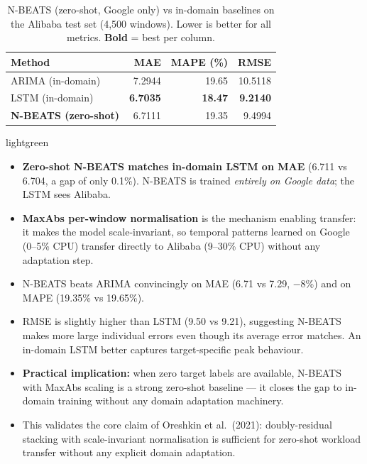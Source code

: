 \documentclass[12pt,a4paper]{article}
\begin{document}
\begin{table}[H]
\centering
\small
\caption{N-BEATS (zero-shot, Google only) vs in-domain baselines on the Alibaba test set
         (4,500 windows).  Lower is better for all metrics.  \textbf{Bold} = best per column.}
\label{tab:nbeats}
\begin{tabular}{@{}lrrr@{}}
\toprule
\textbf{Method} & \textbf{MAE} & \textbf{MAPE (\%)} & \textbf{RMSE} \\
\midrule
ARIMA (in-domain)   & 7.2944 & 19.65 & 10.5118 \\
LSTM (in-domain)    & \textbf{6.7035} & \textbf{18.47} & \phantom{0}\textbf{9.2140} \\
\midrule
\textcolor{nbeatscolor}{\textbf{N-BEATS (zero-shot)}} &
  6.7111 & 19.35 & \phantom{0}9.4994 \\
\bottomrule
\end{tabular}
\end{table}

\begin{keybox}{lightgreen}
\begin{itemize}[leftmargin=*,noitemsep]
  \item \textbf{Zero-shot N-BEATS matches in-domain LSTM on MAE} (6.711 vs 6.704, a gap of
        only 0.1\%).  N-BEATS is trained \emph{entirely on Google data}; the LSTM sees Alibaba.
  \item \textbf{MaxAbs per-window normalisation} is the mechanism enabling transfer: it makes
        the model scale-invariant, so temporal patterns learned on Google (0--5\% CPU) transfer
        directly to Alibaba (9--30\% CPU) without any adaptation step.
  \item N-BEATS beats ARIMA convincingly on MAE (6.71 vs 7.29, $-$8\%) and on MAPE
        (19.35\% vs 19.65\%).
  \item RMSE is slightly higher than LSTM (9.50 vs 9.21), suggesting N-BEATS makes
        more large individual errors even though its average error matches.
        An in-domain LSTM better captures target-specific peak behaviour.
  \item \textbf{Practical implication:} when zero target labels are available,
        N-BEATS with MaxAbs scaling is a strong zero-shot baseline --- it closes
        the gap to in-domain training without any domain adaptation machinery.
  \item This validates the core claim of Oreshkin et al.\ (2021): doubly-residual
        stacking with scale-invariant normalisation is sufficient for zero-shot
        workload transfer without any explicit domain adaptation.
\end{itemize}
\end{keybox}
\end{document}
